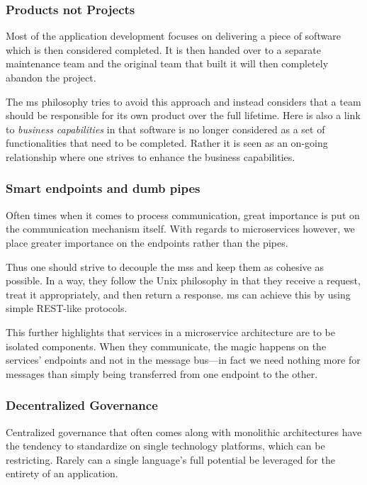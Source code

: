 \subsubsection{Products not Projects}

Most of the application development focuses on delivering a piece of
software which is then considered completed. It is then handed over to
a separate maintenance team and the original team that built it will
then completely abandon the project. \cite{ms-definition}

The \gls{ms} philosophy tries to avoid this approach and instead
considers that a team should be responsible for its own product over
the full lifetime. Here is also a link to \textit{business
capabilities} in that software is no longer considered as a set of
functionalities that need to be completed. Rather it is seen as an
on-going relationship where one strives to enhance the business
capabilities.  \cite{ms-definition}

\subsubsection{Smart endpoints and dumb pipes}

Often times when it comes to process communication, great importance
is put on the communication mechanism itself. With regards to
microservices however, we place greater importance on the endpoints
rather than the pipes. \cite{ms-definition}

Thus one should strive to decouple the \glspl{ms} and keep them as
cohesive as possible. In a way, they follow the Unix
philosophy in that they receive a request, treat it appropriately, and
then return a response. \gls{ms} can achieve this by using simple
REST-like protocols. \cite{ms-definition}

This further highlights that services in a microservice architecture
are to be isolated components. When they communicate, the
magic happens on the services' endpoints and not in the message
bus---in fact we need nothing more for messages than simply being
transferred from one endpoint to the other. \cite{ms-definition}

\subsubsection{Decentralized Governance}

Centralized governance that often comes along with monolithic
architectures have the tendency to standardize on single technology
platforms, which can be restricting. Rarely can a single language's
full potential be leveraged for the entirety of an application.
\cite{ms-definition}

